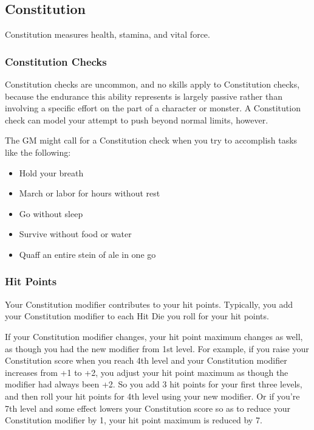 \subsection{Constitution}

Constitution measures health, stamina, and vital force.

\subsubsection{Constitution Checks}

Constitution checks are uncommon, and no skills apply to Constitution checks, because the endurance this ability represents is largely passive rather than involving a specific effort on the part of a character or monster. A Constitution check can model your attempt to push beyond normal limits, however.

The GM might call for a Constitution check when you try to accomplish tasks like the following:

\begin{itemize}
\item Hold your breath
\item March or labor for hours without rest
\item Go without sleep
\item Survive without food or water
\item Quaff an entire stein of ale in one go
\end{itemize}

\subsubsection{Hit Points}

Your Constitution modifier contributes to your hit points. Typically, you add your Constitution modifier to each Hit Die you roll for your hit points.

If your Constitution modifier changes, your hit point maximum changes as well, as though you had the new modifier from 1st level. For example, if you raise your Constitution score when you reach 4th level and your Constitution modifier increases from +1 to +2, you adjust your hit point maximum as though the modifier had always been +2. So you add 3 hit points for your first three levels, and then roll your hit points for 4th level using your new modifier. Or if you're 7th level and some effect lowers your Constitution score so as to reduce your Constitution modifier by 1, your hit point maximum is reduced by 7.

